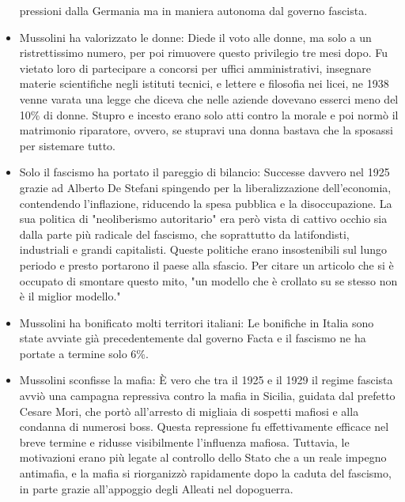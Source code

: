 \documentclass[12pt]{book} %
\begin{document}
\begin{mdframed}[linewidth=1pt]
\begin{itemize}
pressioni dalla Germania ma in maniera autonoma dal governo fascista.
\item Mussolini ha valorizzato le donne: Diede il voto alle donne, ma solo a un ristrettissimo numero, per poi rimuovere
questo privilegio tre mesi dopo. Fu vietato loro di partecipare a concorsi per uffici amministrativi, insegnare materie
scientifiche negli istituti tecnici, e lettere e filosofia nei licei, ne 1938 venne varata una legge che diceva che
nelle aziende dovevano esserci meno del 10\% di donne. Stupro e incesto erano solo atti contro la morale e poi normò il
matrimonio riparatore, ovvero, se stupravi una donna bastava che la sposassi per sistemare tutto.
\item Solo il fascismo ha portato il pareggio di bilancio: Successe davvero nel 1925 grazie ad Alberto De Stefani
spingendo per la liberalizzazione dell'economia, contendendo l'inflazione, riducendo la spesa pubblica e la
disoccupazione. La sua politica di "neoliberismo autoritario" era però vista di cattivo
occhio sia dalla parte più radicale del fascismo, che soprattutto da latifondisti, industriali e grandi capitalisti.
Queste politiche erano insostenibili sul lungo periodo e presto portarono il paese alla sfascio. Per citare un
articolo che si è occupato di smontare questo
mito, "un modello che è crollato su se stesso non è il miglior modello."
\item Mussolini ha bonificato molti territori italiani: Le bonifiche in Italia sono state avviate già precedentemente
dal governo Facta e il fascismo ne ha portate a termine solo 6\%.
\item Mussolini sconfisse la mafia: È vero che tra il 1925 e il 1929 il regime fascista avviò una campagna repressiva contro la mafia in Sicilia, guidata dal prefetto Cesare Mori, che portò all’arresto di migliaia di sospetti mafiosi e alla condanna di numerosi boss. Questa repressione fu effettivamente efficace nel breve termine e ridusse visibilmente l'influenza mafiosa. Tuttavia, le motivazioni erano più legate al controllo dello Stato che a un reale impegno antimafia, e la mafia si riorganizzò rapidamente dopo la caduta del fascismo, in parte grazie all'appoggio degli Alleati nel dopoguerra.

\end{itemize}
\end{mdframed}
\end{document}

